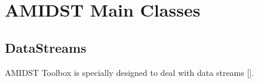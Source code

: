 \chapter{AMIDST Main Classes}\label{sec:codeExamples}

\section{DataStreams}


AMIDST Toolbox is specially designed to deal with data streams []. 



\begin{lstlisting}


\end{lstlisting}